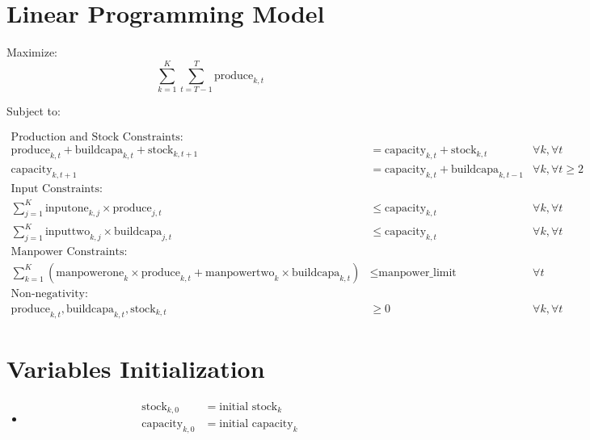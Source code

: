 \documentclass{article}
\begin{document}
\section*{Linear Programming Model}

Maximize:
\[
\sum_{k=1}^{K} \sum_{t=T-1}^{T} \text{produce}_{k, t}
\]

Subject to:

\begin{align*}
\text{Production and Stock Constraints:} \\
\text{produce}_{k, t} + \text{buildcapa}_{k, t} + \text{stock}_{k, t+1} &= \text{capacity}_{k, t} + \text{stock}_{k, t} & \forall k, \forall t \\
\text{capacity}_{k, t+1} &= \text{capacity}_{k, t} + \text{buildcapa}_{k, t-1} & \forall k, \forall t \geq 2 \\

\text{Input Constraints:} \\
\sum_{j=1}^{K} \text{inputone}_{k, j} \times \text{produce}_{j, t} &\leq \text{capacity}_{k, t} & \forall k, \forall t \\
\sum_{j=1}^{K} \text{inputtwo}_{k, j} \times \text{buildcapa}_{j, t} &\leq \text{capacity}_{k, t} & \forall k, \forall t \\

\text{Manpower Constraints:} \\
\sum_{k=1}^{K} (\text{manpowerone}_k \times \text{produce}_{k, t} + \text{manpowertwo}_k \times \text{buildcapa}_{k, t}) &\leq \text{manpower\_limit} & \forall t \\

\text{Non-negativity:} \\
\text{produce}_{k, t}, \text{buildcapa}_{k, t}, \text{stock}_{k, t} &\geq 0 & \forall k, \forall t
\end{align*}

\section*{Variables Initialization}

\begin{itemize}
\item {}
\begin{align*}
\text{stock}_{k, 0} &= \text{initial stock}_k \\
\text{capacity}_{k, 0} &= \text{initial capacity}_k \\
\end{align*}
\end{itemize}
\end{document}
